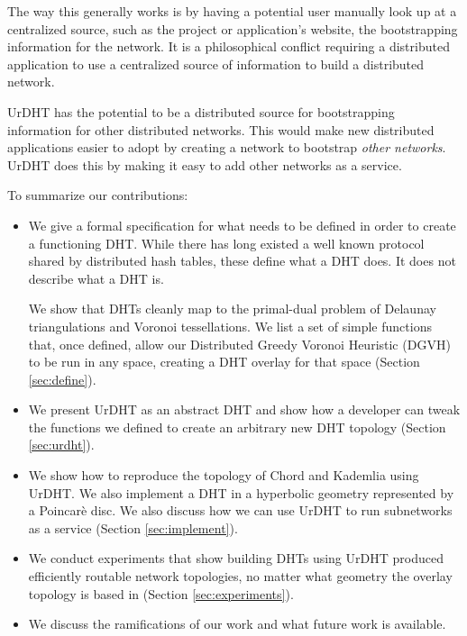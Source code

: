 \documentclass[11pt,conference]{IEEEtran}
\begin{document}
The way this generally works is by having a potential user manually look up at a centralized source, such as the project or application's website, the bootstrapping information for the network.
It is a philosophical conflict requiring a distributed application to use a centralized source of information to build a distributed network.

UrDHT has the potential to be a distributed source for bootstrapping information for other distributed networks.
This would make new distributed applications easier to adopt by creating a network to bootstrap \textit{other networks}.
UrDHT does this by making it easy to add other networks as a service.

To summarize our contributions:
\begin{itemize}
	\item We give a formal specification for what needs to be defined in order to create a functioning DHT.
	While there has long existed a well known protocol shared by distributed hash tables, these define what a DHT does.
	It does not describe what a DHT is.
	
	We show that DHTs cleanly map to the primal-dual problem of Delaunay triangulations and Voronoi tessellations.
	We list a set of simple functions that, once defined, allow our Distributed Greedy Voronoi Heuristic (DGVH) to be run in any space, creating a DHT overlay for that space (Section \ref{sec:define}).
	
	\item We present UrDHT as an abstract DHT and show how a developer can tweak the functions we defined to create an arbitrary new DHT topology (Section \ref{sec:urdht}).
	\item We show how to reproduce the topology of Chord and Kademlia using UrDHT.
	We also implement a DHT in a hyperbolic geometry represented  by a Poincar\`{e} disc.
	We also discuss how we can use UrDHT to run subnetworks as a service (Section \ref{sec:implement}).
	\item We conduct experiments that show building DHTs using UrDHT produced efficiently routable network topologies, no matter what geometry the overlay topology  is based in (Section \ref{sec:experiments}). 
	\item We discuss the ramifications of our work and what future work is available.
\end{itemize}
\end{document}
